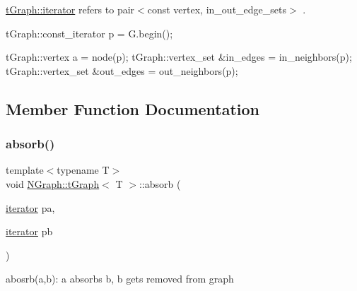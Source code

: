 \mbox{\hyperlink{class_n_graph_1_1t_graph_a6e446a33b74e5c0c39fb6c50a4f07cec}{t\+Graph\+::iterator}} refers to pair$<$const vertex, in\+\_\+out\+\_\+edge\+\_\+sets$>$ .


\begin{DoxyPre}
      tGraph::const\_iterator p = G.begin();\end{DoxyPre}



\begin{DoxyPre}      tGraph::vertex a = node(p);
      tGraph::vertex\_set  \&in\_edges = in\_neighbors(p);
      tGraph::vertex\_set  \&out\_edges = out\_neighbors(p);\end{DoxyPre}



\begin{DoxyPre}\end{DoxyPre}
 

\subsection{Member Function Documentation}
\mbox{\label{class_n_graph_1_1t_graph_a1844ff9c48370c79147c84384f400c80}} 
\subsubsection{\texorpdfstring{absorb()}{absorb()}}
{\footnotesize\ttfamily template$<$typename T$>$ \\
void \mbox{\hyperlink{class_n_graph_1_1t_graph}{N\+Graph\+::t\+Graph}}$<$ T $>$\+::absorb (\begin{DoxyParamCaption}\item[{\mbox{\hyperlink{class_n_graph_1_1t_graph_a6e446a33b74e5c0c39fb6c50a4f07cec}{iterator}}}]{pa,  }\item[{\mbox{\hyperlink{class_n_graph_1_1t_graph_a6e446a33b74e5c0c39fb6c50a4f07cec}{iterator}}}]{pb }\end{DoxyParamCaption})\hspace{0.3cm}{\ttfamily [inline]}}

abosrb(a,b)\+: \textquotesingle{}a\textquotesingle{} absorbs \textquotesingle{}b\textquotesingle{}, b gets removed from graph \mbox{\label{class_n_graph_1_1t_graph_a4f7e150eadbb8845e8f858255022a037}} 
